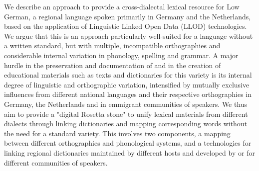 We describe an approach to provide a cross-dialectal lexical resource for Low German, a regional language spoken primarily in Germany and the Netherlands, based on the application of Linguistic Linked Open Data (LLOD) technologies. We argue that this is an approach particularly well-suited for a language without a written standard, but with multiple, incompatible orthographies and considerable internal variation in phonology, spelling and grammar. A major hurdle in the preservation and documentation of and in the creation of educational materials such as texts and dictionaries for this variety is its internal degree of linguistic and orthographic variation, intensified by mutually exclusive influences from different national languages and their respective orthographies in Germany, the Netherlands and in emmigrant communities of speakers. We thus aim to provide a "digital Rosetta stone" to unify lexical materials from different dialects through linking dictionaries and mapping corresponding words without the need for a standard variety. This involves two components, a mapping between different orthographies and phonological systems, and a technologies for linking regional dictionaries maintained by different hosts and developed by or for different communities of speakers.
